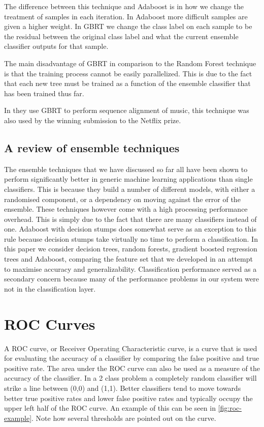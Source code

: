 \documentclass[ %
                    author={Sam Phippen},
                supervisor={Dr. Rafal Bogacz},
                     title={Real time voice activity detectors in noisy personal computing environments},
                  subtitle={},
                    degree={MEng},
                      year={2012} ]{thesis}
\begin{document}
The difference between this technique and Adaboost is in how we change the
treatment of samples in each iteration. In Adaboost more difficult samples are
given a higher weight. In GBRT we change the class label on each sample to be
the residual between the original class label and what the current ensemble
classifier outputs for that sample.

The main disadvantage of GBRT in comparison to the Random Forest technique is
that the training process cannot be easily parallelized. This is due to the
fact that each new tree must be trained as a function of the ensemble
classifier that has been trained thus far.

In \cite{parker} they use GBRT to perform sequence alignment of music, this
technique was also used by the winning submission to the Netflix prize.

\subsection{A review of ensemble techniques}

The ensemble techniques that we have discussed so far all have been shown to
perform significantly better in generic machine learning applications than
single classifiers. This is because they build a number of different models,
with either a randomised component, or a dependency on moving against the error
of the ensemble. These techniques however come with a high processing
performance overhead. This is simply due to the fact that there are many
classifiers instead of one. Adaboost with decision stumps does somewhat serve
as an exception to this rule because decision stumps take virtually no time to
perform a classification. In this paper we consider decision trees, random
forests, gradient boosted regression trees and Adaboost, comparing the feature
set that we developed in an attempt to maximise accuracy and generalizability.
Classification performance  served as a secondary concern because many of the
performance problems in our system were not in the classification layer.

\section{ROC Curves}

A ROC curve, or Receiver Operating Characteristic curve, is a curve that is
used for evaluating the accuracy of a classifier by comparing the false
positive and true positive rate. The area under the ROC curve can also be used
as a measure of the accuracy of the classifier. In a 2 class problem a
completely random classifier will strike a line between (0,0) and (1,1). Better
classifiers tend to move towards better true positive rates and lower false
positive rates and typically occupy the upper left half of the ROC curve. An
example of this can be seen in \ref{fig:roc-example}. Note how several
thresholds are pointed out on the curve.
\end{document}
